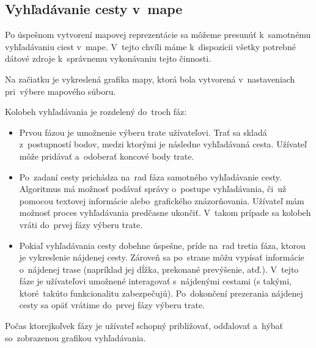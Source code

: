 \subsection{Vyhľadávanie cesty v~mape}

Po úspešnom vytvorení mapovej reprezentácie sa môžeme presunúť k~samotnému vyhľadávaniu ciest v~mape. V~tejto chvíli máme k~dispozícii všetky potrebné dátové zdroje k~správnemu vykonávaniu tejto činnosti.

Na začiatku je vykreslená grafika mapy, ktorá bola vytvorená v~nastaveniach pri~výbere mapového súboru.

Kolobeh vyhľadávania je rozdelený do~troch fáz:
\begin{itemize}
    \item Prvou fázou je umožnenie výberu trate užívateľovi. Trať sa skladá z~postupností bodov, medzi ktorými je následne vyhľadávaná cesta. Užívateľ môže pridávať a~odoberať koncové body trate.
    \item Po~zadaní cesty prichádza na~rad fáza samotného vyhľadávanie cesty. Algoritmus má možnosť podávať správy o~postupe vyhľadávania, či~už pomocou textovej informácie alebo~grafického znázorňovania. Užívateľ mám možnosť proces vyhľadávania predčasne ukončiť. V~takom prípade sa kolobeh vráti do~prvej fázy výberu trate.
    \item Pokiaľ vyhľadávania cesty dobehne úspešne, príde na~rad tretia fáza, ktorou je vykreslenie nájdenej cesty. Zároveň sa po~strane môžu vypísať informácie o~nájdenej trase (napríklad jej dĺžka, prekonané prevýšenie, atď.). V~tejto fáze je užívateľovi umožnené interagovať s~nájdenými cestami (s takými, ktoré~takúto funkcionalitu zabezpečujú). Po~dokončení prezerania nájdenej cesty sa opäť vrátime do~prvej fázy výberu trate.  
\end{itemize}

Počas ktorejkoľvek fázy je užívateľ schopný približovať, odďalovať a~hýbať so~zobrazenou grafikou vyhľadávania.

